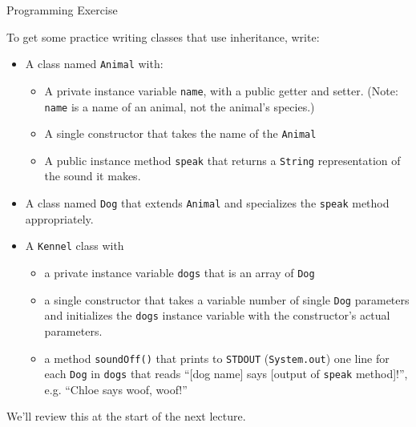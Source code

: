 \documentclass{beamer}
\begin{document}






\begin{frame}[fragile]{Programming Exercise}


To get some practice writing classes that use inheritance, write:
\begin{itemize}
\item A class named {\tt Animal} with:
\begin{itemize}
\item A private instance variable {\tt name}, with a public getter and setter. (Note: {\tt name} is a name of an animal, not the animal's species.)
\item A single constructor that takes the name of the {\tt Animal}
\item A public instance method {\tt speak} that returns a {\tt String} representation of the sound it makes.
\end{itemize}

\item A class named {\tt Dog} that extends {\tt Animal} and specializes the {\tt speak} method appropriately.

\item A {\tt Kennel} class with
\begin{itemize}
\item a private instance variable {\tt dogs} that is an array of {\tt Dog}
\item a single constructor that takes a variable number of single {\tt Dog} parameters and initializes the {\tt dogs} instance variable with the constructor's actual parameters.
\item a method {\tt soundOff()} that prints to {\tt STDOUT} ({\tt System.out}) one line for each {\tt Dog} in {\tt dogs} that reads ``[dog name] says [output of {\tt speak} method]!'', e.g. ``Chloe says woof, woof!''
\end{itemize}

\end{itemize}
We'll review this at the start of the next lecture.

\end{frame}
\end{document}
